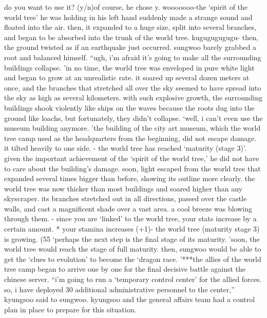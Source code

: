  do you want to use it? (y/n)of course, he chose y.
wooooooo-the ‘spirit of the world tree’ he was holding in his left hand suddenly made a strange sound and floated into the air.
then, it expanded to a huge size, split into several branches, and began to be absorbed into the trunk of the world tree.
kugugugugugu-
then, the ground twisted as if an earthquake just occurred.
 sungwoo barely grabbed a root and balanced himself.
“ugh, i’m afraid it’s going to make all the surrounding buildings collapse.
’in no time, the world tree was enveloped in pure white light and began to grow at an unrealistic rate.
 it soared up several dozen meters at once, and the branches that stretched all over the sky seemed to have spread into the sky as high as several kilometers.
with such explosive growth, the surrounding buildings shook violently like ships on the waves because the roots dug into the ground like loachs, but fortunately, they didn’t collapse.
‘well, i can’t even use the museum building anymore.
’the building of the city art museum, which the world tree camp used as the headquarters from the beginning, did not escape damage.
 it tilted heavily to one side.
- the world tree has reached ‘maturity (stage 3)’.
given the important achievement of the ‘spirit of the world tree,’ he did not have to care about the building’s damage.
soon, light escaped from the world tree that expanded several times bigger than before, showing its outline more clearly.
the world tree was now thicker than most buildings and soared higher than any skyscraper.
 its branches stretched out in all directions, passed over the castle walls, and cast a magnificent shade over a vast area.
 a cool breeze was blowing through them.
- since you are ‘linked’ to the world tree, your stats increase by a certain amount.
* your stamina increases (+1)- the world tree (maturity stage 3) is growing.
 (55%
‘perhaps the next step is the final stage of its maturity.
’soon, the world tree would reach the stage of full maturity.
 then, sungwoo would be able to get the ‘clues to evolution’ to become the ‘dragon race.
’***the allies of the world tree camp began to arrive one by one for the final decisive battle against the chinese server.
“i’m going to run a ‘temporary control center’ for the allied forces.
 so, i have deployed 30 additional administrative personnel to the center,” kyungsoo said to sungwoo.
kyungsoo and the general affairs team had a control plan in place to prepare for this situation.
